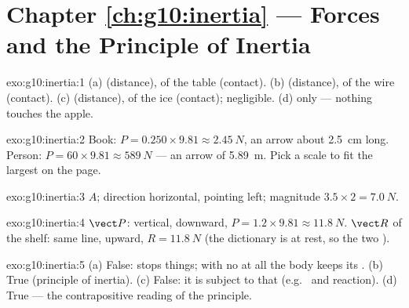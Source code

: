 \section*{Chapter \ref{ch:g10:inertia} --- Forces and the Principle of Inertia}

\begin{solution}{exo:g10:inertia:1}
(a)  (distance),  of the table (contact).
(b)  (distance),  of the wire (contact).
(c)  (distance),  of the ice (contact); 
negligible. (d)  only --- nothing touches the apple.
\end{solution}

\begin{solution}{exo:g10:inertia:2}
Book: $P = 0.250 \times 9.81 \approx \qty{2.45}{N}$, an arrow about
\qty{2.5}{cm} long. Person: $P = 60 \times 9.81 \approx \qty{589}{N}$
--- an arrow of \qty{5.89}{m}. Pick a scale to fit the largest  on
the page.
\end{solution}

\begin{solution}{exo:g10:inertia:3}
 $A$; direction horizontal, pointing left;
magnitude $3.5 \times 2 = \qty{7.0}{N}$.
\end{solution}

\begin{solution}{exo:g10:inertia:4}
 $\vect P$: vertical, downward, $P = 1.2 \times 9.81 \approx
\qty{11.8}{N}$.  $\vect R$ of the shelf: same line,
upward, $R = \qty{11.8}{N}$ (the dictionary is at rest, so the two
).
\end{solution}

\begin{solution}{exo:g10:inertia:5}
(a) False:  stops things; with no  at all the body keeps
its . (b) True (principle of inertia).
(c) False: it is subject to  that \emph{} (e.g.\ 
and reaction). (d) True --- the contrapositive reading of the
principle.
\end{solution}

